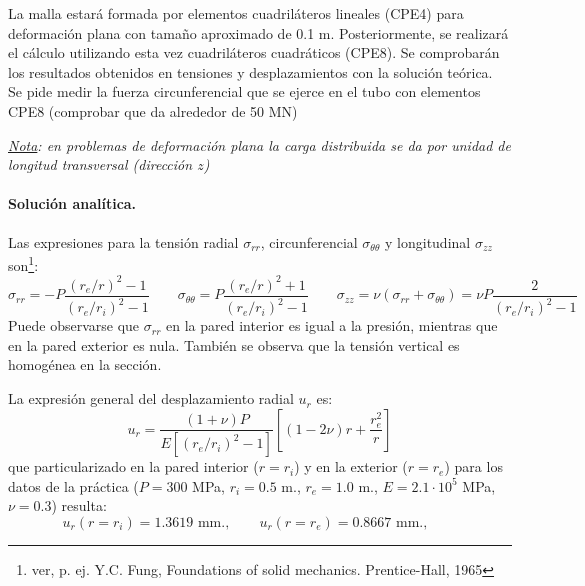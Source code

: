 \documentclass[a4paper,12pt]{article}
\begin{document}
La malla estará formada por elementos cuadriláteros lineales (CPE4) para deformación plana con tamaño aproximado de 0.1 m. Posteriormente, se realizará el cálculo utilizando esta vez cuadriláteros cuadráticos (CPE8). Se comprobarán los resultados obtenidos en tensiones y desplazamientos con la solución teórica.\\

Se pide medir la fuerza circunferencial que se ejerce en el tubo con elementos CPE8 (comprobar que da alrededor de 50 MN)

\noindent

\vspace{4mm}
{\em \underline {Nota}: en problemas de deformación plana
la carga distribuida se da por unidad de longitud transversal
(dirección $z$)}

\paragraph{Solución analítica.}   Las expresiones para la 
tensión radial $\sigma_{rr}$,
circunferencial $\sigma_{\theta \theta}$ y longitudinal $\sigma_{zz}$ 
son\footnote{ver, p. ej. Y.C. Fung, Foundations of solid mechanics. Prentice-Hall, 1965}:
\begin{equation*} 
\sigma_{rr}=-P \frac{{( r_e/r) }^2 -1}
{{( r_e/r_i)}^2 -1} \qquad 
\sigma_{\theta \theta}=
P \frac{{( r_e/r) }^2 +1}
{{( r_e/r_i)}^2 -1} \qquad 
\sigma_{zz}=\nu(\sigma_{rr}+\sigma_{\theta \theta})
=\nu P \frac{2}
{{( r_e/r_i)}^2 -1}
\end{equation*} 
Puede observarse que $\sigma_{rr}$ en la pared interior es igual
a la presión, mientras que en la pared exterior es nula.  También se
observa que la tensión vertical es homogénea en la sección.

La expresión general del desplazamiento radial $u_r$ es:
\begin{equation*}
u_r=\frac{(1+\nu)P}{E [{(r_e/r_i)}^2-1 ]} \left [ 
(1-2 \nu) r +\frac{r_e^2}{r} \right ] 
\end{equation*}
que particularizado en la pared interior ($r=r_i$) y en la exterior ($r=r_e$)
para los datos de la práctica ($P=300$ MPa, $r_i=0.5$ m., $r_e=1.0$ m., 
$E=2.1 \cdot 10^5$ MPa, $\nu=0.3$) resulta:
\begin{equation*}
u_r(r=r_i)=1.3619 \textrm{ mm.},\qquad
u_r(r=r_e)=0.8667 \textrm{ mm.},\qquad
\end{equation*}
\end{document}

